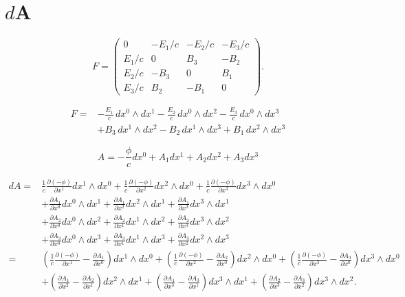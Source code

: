 \section{$d$A
	\label{maxwell:section:dA}}
\begin{equation}
	F = \begin{pmatrix}
		0 & -E_1/c & -E_2/c & -E_3/c \\ E_1/c & 0 & B_3 & -B_2 \\ E_2/c & -B_3 & 0 & B_1 \\ E_3/c & B_2 & -B_1 & 0 
	\end{pmatrix}.
\end{equation}

\begin{align*}
	F = 
	& - \frac{E_{1}}{c} \, dx^0 \wedge dx^1 - \frac{E_{2}}{c} \, dx^0 \wedge dx^2 - \frac{E_{3}}{c} \, dx^0 \wedge dx^3 \\
	& + B_3 \, dx^1 \wedge dx^2 - B_2 \, dx^1 \wedge dx^3 + B_1 \, dx^2 \wedge dx^3
\end{align*}

\begin{equation}
	A = -\frac{\phi}{c}dx^0 + A_1 dx^1 + A_2 dx^2 + A_3 dx^3
\end{equation}

\begin{align*}
	dA = 
	& \frac{1}{c}\frac{\partial (-\phi)}{\partial x^1} dx^1 \wedge dx^0
	+ \frac{1}{c}\frac{\partial (-\phi)}{\partial x^2} dx^2 \wedge dx^0
	+ \frac{1}{c}\frac{\partial (-\phi)}{\partial x^3} dx^3 \wedge dx^0\\
	& + \frac{\partial A_1}{\partial x^0} dx^0 \wedge dx^1
	+ \frac{\partial A_1}{\partial x^2} dx^2 \wedge dx^1
	+ \frac{\partial A_1}{\partial x^3} dx^3 \wedge dx^1\\
	& + \frac{\partial A_2}{\partial x^0} dx^0 \wedge dx^2
	+ \frac{\partial A_2}{\partial x^1} dx^1 \wedge dx^2
	+ \frac{\partial A_2}{\partial x^3} dx^3 \wedge dx^2\\
	& + \frac{\partial A_3}{\partial x^0} dx^0 \wedge dx^3
	+ \frac{\partial A_3}{\partial x^1} dx^1 \wedge dx^3
	+ \frac{\partial A_3}{\partial x^2} dx^2 \wedge dx^3\\[2ex] =
	& \left(\frac{1}{c}\frac{\partial (-\phi)}{\partial x^1}-\frac{\partial A_1}{\partial x^0}\right) dx^1 \wedge dx^0 +
	\left(\frac{1}{c}\frac{\partial (-\phi)}{\partial x^2}-\frac{\partial A_2}{\partial x^0}\right) dx^2 \wedge dx^0 +
	\left(\frac{1}{c}\frac{\partial (-\phi)}{\partial x^3}-\frac{\partial A_3}{\partial x^0}\right) dx^3 \wedge dx^0\\
	& + \left(\frac{\partial A_1}{\partial x^2}-\frac{\partial A_2}{\partial x^1}\right) dx^2 \wedge dx^1 +
	\left(\frac{\partial A_1}{\partial x^3}-\frac{\partial A_3}{\partial x^1}\right) dx^3 \wedge dx^1 +
	\left(\frac{\partial A_2}{\partial x^3}-\frac{\partial A_3}{\partial x^2}\right) dx^3 \wedge dx^2.				
\end{align*}

